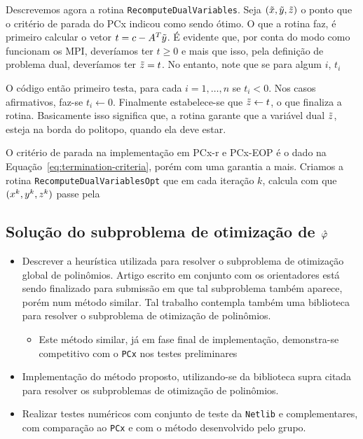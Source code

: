 Descrevemos agora a rotina \verb|RecomputeDualVariables|. Seja $(\tilde{x},\tilde{y},\tilde{z})$ o ponto que o critério de parada do PCx indicou como sendo ótimo. O que a rotina faz, é primeiro calcular o vetor  $t= c - A^T\tilde{y}$. É evidente que, por conta do modo como funcionam os \ac{MPI}, deveríamos ter $t\geq0$ e mais que isso, pela definição de problema dual, deveríamos ter $\tilde{z} = t$. No entanto, note que  se para algum $i$, $t_{i}$

 O código então primeiro testa, para cada  $i = 1,\ldots,n$ se $t_{i}<0$.  Nos casos afirmativos, faz-se $t_{i}\leftarrow 0$. Finalmente estabelece-se que  $\tilde{z} \leftarrow t $, o que finaliza a rotina. Basicamente isso significa que, a rotina garante que a variável dual $\tilde{z}$, esteja na borda do politopo, quando ela deve estar. 




O critério de parada   na implementação em PCx-r e PCx-EOP é o dado na Equação~\eqref{eq:termination-criteria}, porém com uma garantia a mais. Criamos a rotina \verb|RecomputeDualVariablesOpt| que em cada iteração $k$, calcula  com que $(x^{k},y^{k},z^{k})$ passe pela 



\subsection{Solução do subproblema de otimização \texorpdfstring{de $\hat{\varphi}$}{da função de mérito}}


\begin{itemize}
\item Descrever a heurística utilizada para resolver o subproblema de otimização
global de polinômios. Artigo escrito em conjunto com os orientadores está sendo
finalizado para submissão em que tal subproblema também aparece, porém num
método similar. Tal trabalho contempla também uma biblioteca para resolver o
subproblema de otimização de polinômios.
\begin{itemize}
  \item Este método similar, já em fase final de implementação,
  demonstra-se competitivo com o \texttt{PCx} nos testes preliminares
 \end{itemize}
\item Implementação do método proposto, utilizando-se da biblioteca supra
citada para resolver os subproblemas de otimização de polinômios.
\item Realizar  testes
numéricos com conjunto de teste da \texttt{Netlib} e complementares, com
comparação ao \texttt{PCx} e com o método desenvolvido pelo grupo.
\end{itemize}



